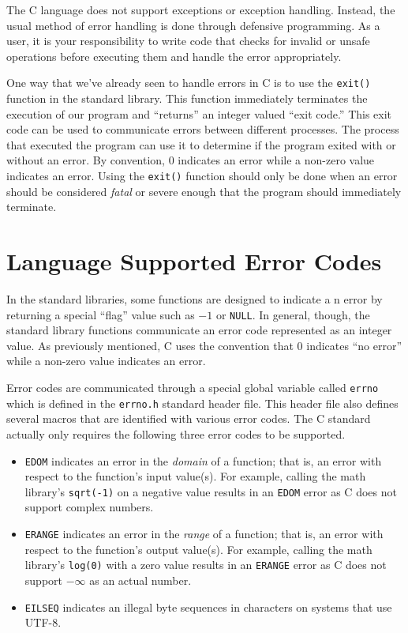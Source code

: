 

The C language does not support exceptions or exception handling.
Instead, the usual method of error handling is done through 
defensive programming.  As a user, it is your responsibility to
write code that checks for invalid or unsafe operations before
executing them and handle the error appropriately.

One way that we've already seen to handle errors in C is to use
the \texttt{exit()} function in the standard library.  This function
immediately terminates the execution of our program and ``returns''
an integer valued ``exit code.''  This exit code can be used to
communicate errors between different processes.  The process that
executed the program can use it to determine if the program exited
with or without an error.  By convention, 0 indicates an error while
a non-zero value indicates an error.  Using the \texttt{exit()} 
function should only be done when an error should be considered
\emph{fatal} or severe enough that the program should immediately
terminate.

\section{Language Supported Error Codes}

In the standard libraries, some functions are designed to indicate a
n error by returning a special ``flag'' value such as $-1$ or 
\texttt{NULL}.  In general, though, the standard library functions
communicate an error code represented as an integer value.
As previously mentioned, C uses the convention that 0 
indicates ``no error'' while a non-zero value indicates an error.

Error codes are communicated through a special global variable called
\texttt{errno} which is defined in the \texttt{errno.h} 
standard header file.  This header file also defines several macros 
that are identified with various error codes.  The C standard actually
only requires the following three error codes to be supported.  

\begin{itemize}
  \item \texttt{EDOM} indicates an error in the \emph{domain} 
  	of a function; that is, an error with respect to the function's input value(s).
	For example, calling the math library's \texttt{sqrt(-1)} on a negative
	value results in an \texttt{EDOM} error as C does not support
	complex numbers.
  \item \texttt{ERANGE} indicates an error in the \emph{range}
  	of a function; that is, an error with respect to the function's output value(s).
	For example, calling the math library's \texttt{log(0)} with a zero
	value results in an \texttt{ERANGE} error as C does not 
	support $-\infty$ as an actual number.
  \item \texttt{EILSEQ} indicates an illegal byte sequences in 
  	characters on systems that use UTF-8.
\end{itemize}

